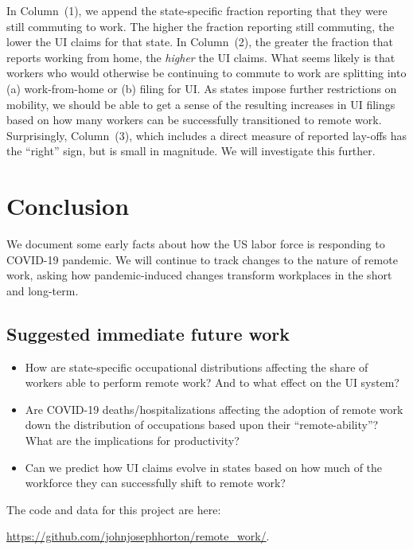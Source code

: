 \documentclass[12pt]{article}
\begin{document}


In Column~(1), we append the state-specific fraction reporting that they were still commuting to work.
The higher the fraction reporting still commuting, the lower the UI claims for that state.
In Column~(2), the greater the fraction that reports working from home, the \emph{higher} the UI claims.
What seems likely is that workers who would otherwise be continuing to commute to work are splitting into (a) work-from-home or (b) filing for UI.
As states impose further restrictions on mobility, we should be able to get a sense of the resulting increases in UI filings based on how many workers can be successfully transitioned to remote work. 
Surprisingly, Column~(3), which includes a direct measure of reported lay-offs has the ``right'' sign, but is small in magnitude.
We will investigate this further.

\section{Conclusion}
We document some early facts about how the US labor force is responding to COVID-19 pandemic.
We will continue to track changes to the nature of remote work, asking how pandemic-induced changes transform workplaces in the short and long-term.

\subsection{Suggested immediate future work} 

\begin{itemize}
\item How are state-specific occupational distributions affecting the share of workers able to perform remote work? And to what effect on the UI system? 
\item Are COVID-19 deaths/hospitalizations affecting the adoption of remote work down the distribution of occupations based upon their ``remote-ability''? What are the implications for productivity?
\item Can we predict how UI claims evolve in states based on how much of the workforce they can successfully shift to remote work? 
\end{itemize}

The code and data for this project are here:

\href{https://github.com/johnjosephhorton/remote\_work/}{https://github.com/johnjosephhorton/remote\_work/}.
\end{document}
